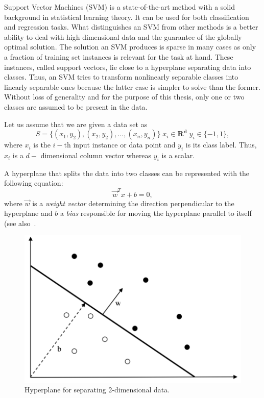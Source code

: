 Support Vector Machines (SVM) \cite{Cortes;Vapnik:1995} is a state-of-the-art method with a solid background in statistical learning theory. It can be used for both classification and regression tasks. What distinguishes an SVM from other methods is a better ability to deal with high dimensional data and the guarantee of the globally optimal solution. The solution an SVM produces is sparse in many cases as only a fraction of training set instances is relevant for the task at hand. These instances, called support vectors, lie close to a hyperplane separating data into classes. Thus, an SVM tries to transform nonlinearly separable classes into linearly separable ones because the latter case is simpler to solve than the former. Without loss of generality and for the purpose of this thesis, only one or two classes are assumed to be present in the data.

Let us assume that we are given a data set as
\[  S = \{(x_1,y_2), (x_2,y_2), ...,(x_n,y_n) \} \; x_i \in \mathbf{R^d} \; y_i \in \{-1,1\}, \]
where \( x_i\) is the \( i-\)th input instance or data point and \( y_i\) is its class label. Thus, \(x_i\) is a \(d-\) dimensional column vector whereas \( y_i\) is a scalar.

A hyperplane that splits the data into two classes can be represented with the following equation:
\[\vec{w}^Tx + b = 0, \] 
where \(\vec{w}\) is a \textit{weight vector} determining the direction perpendicular to the hyperplane and \(b\) a \textit{bias} responsible for moving the hyperplane parallel to itself (see also~\label{fig:hyperplane1}.

\begin{figure}[h!]
    \centering %
    \includegraphics[scale=0.4]{Graphics/svm1.png}
    \caption{Hyperplane for separating 2-dimensional data.}
    \label{fig:hyperplane1}
\end{figure}


